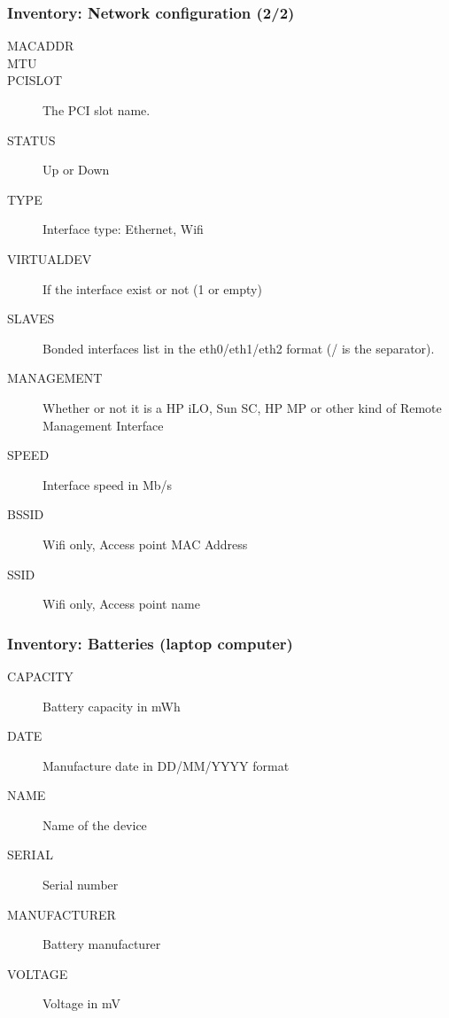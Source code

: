 \documentclass{beamer}
\begin{document}
\begin{frame}
\frametitle{Inventory: Network configuration (2/2)}
\begin{description}
      \item[MACADDR]
      \item[MTU]
      \item[PCISLOT] The PCI slot name.
      \item[STATUS] Up or Down
      \item[TYPE] Interface type: Ethernet, Wifi
      \item[VIRTUALDEV] If the interface exist or not (1 or empty)
      \item[SLAVES] Bonded interfaces list in the eth0/eth1/eth2 format (/ is the separator).
      \item[MANAGEMENT] Whether or not it is a HP iLO, Sun SC, HP MP or other kind of Remote Management Interface
      \item[SPEED] Interface speed in Mb/s
      \item[BSSID] Wifi only, Access point MAC Address
      \item[SSID] Wifi only, Access point name
\end{description}
\end{frame}
\begin{frame}
\frametitle{Inventory: Batteries (laptop computer)}
\begin{description}
      \item[CAPACITY] Battery capacity in mWh
      \item[DATE] Manufacture date in DD/MM/YYYY format
      \item[NAME] Name of the device
      \item[SERIAL] Serial number
      \item[MANUFACTURER] Battery manufacturer
      \item[VOLTAGE] Voltage in mV
\end{description}
\end{frame}
\end{document}
